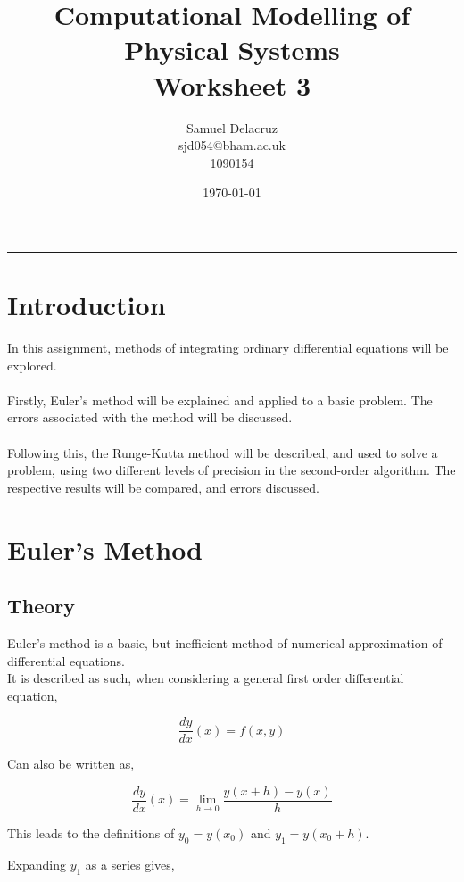 \documentclass[pdf,color]{UoBnote}
\author{Samuel Delacruz\\
				sjd054@bham.ac.uk\\
				1090154}
\title{Computational Modelling of Physical Systems\\Worksheet 3}
\date{\today}
\begin{document}

\maketitle
\tableofcontents
\listoffigures
\listoftables
\vspace{1cm}\hrule \vspace{1cm}
\newpage

\section{Introduction}
In this assignment, methods of integrating ordinary differential equations will be explored.\\\\
Firstly, Euler's method will be explained and applied to a basic problem. The errors associated with the method will be discussed.\\\\
Following this, the Runge-Kutta method will be described, and used to solve a problem, using two different levels of precision in the second-order algorithm. The respective results will be compared, and errors discussed.
\section{Euler's Method}
	\subsection{Theory}
	Euler's method is a basic, but inefficient method of numerical approximation of differential equations.\\
	It is described as such, when considering a general first order differential equation,
	
	\begin{equation}\label{eq:basic_ode}
	\frac{dy}{dx}(x) = f(x,y)
	\end{equation}
	
	Can also be written as,
	
	\begin{equation}
	\frac{dy}{dx}(x) = \lim\limits_{h\rightarrow0}\frac{y(x+h)-y(x)}{h}
	\end{equation}
	
	This leads to the definitions of $y_0 = y(x_0)$ and $y_1 = y(x_0 + h)$.
	
	Expanding $y_1$ as a series gives,
	
\end{document}
